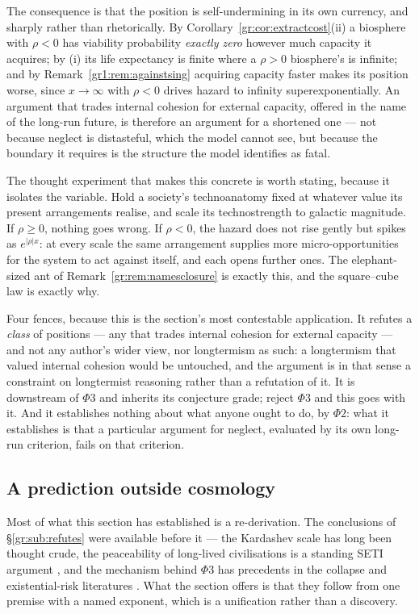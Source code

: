\documentclass[11pt]{article}
\numberwithin{equation}{section}
\theoremstyle{plain}
\theoremstyle{definition}
\theoremstyle{remark}
\begin{document}
The consequence is that the position is self-undermining in its own
currency, and sharply rather than rhetorically. By
Corollary~\ref{gr:cor:extractcost}(ii) a biosphere with $\rho<0$ has
viability probability \emph{exactly zero} however much capacity it
acquires; by (i) its life expectancy is finite where a
$\rho>0$ biosphere's is infinite; and by
Remark~\ref{gr1:rem:againstsing} acquiring capacity faster makes its
position worse, since $x\to\infty$ with $\rho<0$ drives hazard to
infinity superexponentially. An argument that trades internal cohesion
for external capacity, offered in the name of the long-run future, is
therefore an argument for a shortened one --- not because neglect is
distasteful, which the model cannot see, but because the boundary it
requires is the structure the model identifies as fatal.

The thought experiment that makes this concrete is worth stating,
because it isolates the variable. Hold a society's technoanatomy fixed
at whatever value its present arrangements realise, and scale its
technostrength to galactic magnitude. If $\rho\ge0$, nothing goes
wrong. If $\rho<0$, the hazard does not rise gently but spikes as
$e^{|\rho|x}$: at every scale the same arrangement supplies more
micro-opportunities for the system to act against itself, and each
opens further ones. The elephant-sized ant of
Remark~\ref{gr:rem:namesclosure} is exactly this, and the square--cube
law is exactly why.

Four fences, because this is the section's most contestable
application. It refutes a \emph{class} of positions --- any that trades
internal cohesion for external capacity --- and not any author's wider
view, nor longtermism as such: a longtermism that valued internal
cohesion would be untouched, and the argument is in that sense a
constraint on longtermist reasoning rather than a refutation of it. It is downstream of $\Phi3$ and inherits its conjecture grade;
reject $\Phi3$ and this goes with it. And it establishes nothing about
what anyone ought to do, by $\Phi2$: what it establishes is that a
particular argument for neglect, evaluated by its own long-run
criterion, fails on that criterion.

\subsection{A prediction outside cosmology}\label{gr:sub:crossdomain}

Most of what this section has established is a re-derivation. The
conclusions of \S\ref{gr:sub:refutes} were available before it --- the
Kardashev scale has long been thought crude, the peaceability of
long-lived civilisations is a standing SETI argument
\cite{Cooper19}, and the mechanism behind $\Phi3$ has precedents in
the collapse and existential-risk literatures
\cite{Tainter88,Bostrom19}. What the section offers is that they follow
from one premise with a named exponent, which is a unification rather
than a discovery.
\end{document}
